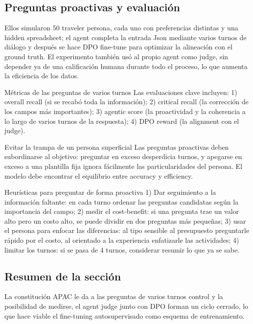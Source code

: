 \subsection{Preguntas proactivas y evaluación}

Ellos simularon 50 traveler persona, cada uno con preferencias distintas y una hidden spreadsheet; el agent completa la entrada Json mediante varios turnos de diálogo y después se hace DPO fine-tune para optimizar la alineación con el ground truth. El experimento también usó al propio agent como judge, sin depender ya de una calificación humana durante todo el proceso, lo que aumenta la eficiencia de los datos.
\begin{knowledgebox}{Métricas de las preguntas de varios turnos}
Las evaluaciones clave incluyen: 1) overall recall (si se recabó toda la información); 2) critical recall (la corrección de los campos más importantes); 3) agentic score (la proactividad y la coherencia a lo largo de varios turnos de la respuesta); 4) DPO reward (la alignment con el judge).
\end{knowledgebox}
\begin{warningbox}{Evitar la trampa de un persona superficial}
Las preguntas proactivas deben subordinarse al objetivo: preguntar en exceso desperdicia turnos, y apegarse en exceso a una plantilla fija ignora fácilmente las particularidades del persona. El modelo debe encontrar el equilibrio entre accuracy y efficiency.
\end{warningbox}
\begin{knowledgebox}{Heurísticas para preguntar de forma proactiva}
1) Dar seguimiento a la información faltante: en cada turno ordenar las preguntas candidatas según la importancia del campo; 2) medir el cost-benefit: si una pregunta trae un valor alto pero un costo alto, se puede dividir en dos preguntas más pequeñas; 3) usar el persona para enfocar las diferencias: al tipo sensible al presupuesto preguntarle rápido por el costo, al orientado a la experiencia enfatizarle las actividades; 4) limitar los turnos: si se pasa de 4 turnos, considerar resumir lo que ya se sabe.
\end{knowledgebox}

\subsection{Resumen de la sección}

La constitución APAC le da a las preguntas de varios turnos control y la posibilidad de medirse, el agent judge junto con DPO forman un ciclo cerrado, lo que hace viable el fine-tuning autosupervisado como esquema de entrenamiento.

